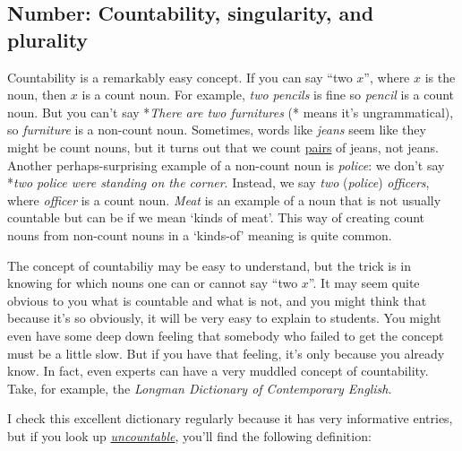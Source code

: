 \subsection{Number: Countability, singularity, and plurality}\label{sec:count}

Countability is a remarkably easy concept. If you can say ``two $x$'', where $x$ is the noun, then $x$ is a count noun. For example, \textit{two pencils} is fine so \textit{pencil} is a count noun. But you can't say *\textit{There are two furnitures} (* means it's ungrammatical), so \textit{furniture} is a non-count noun. Sometimes, words like \textit{jeans} seem like they might be count nouns, but it turns out that we count \uline{pairs} of jeans, not jeans. Another perhaps-surprising example of a non-count noun is \textit{police}: we don't say *\textit{two police were standing on the corner}. Instead, we say \textit{two} (\textit{police}) \textit{officers}, where \textit{officer} is a count noun. \textit{Meat} is an example of a noun that is not usually countable but can be if we mean `kinds of meat'. This way of creating count nouns from non-count nouns in a `kinds-of' meaning is quite common.

The concept of countabiliy may be easy to understand, but the trick is in knowing for which nouns one can or cannot say ``two $x$''. It may seem quite obvious to you what is countable and what is not, and you might think that because it's so obviously, it will be very easy to explain to students. You might even have some deep down feeling that somebody who failed to get the concept must be a little slow. But if you have that feeling, it's only because you already know. In fact, even experts can have a very muddled concept of countability. Take, for example, the \textit{Longman Dictionary of Contemporary English}.

I check this excellent dictionary regularly because it has very informative entries, but if you look up \href{https://www.ldoceonline.com/dictionary/uncountable/}{\textit{uncountable}}, you'll find the following definition:


